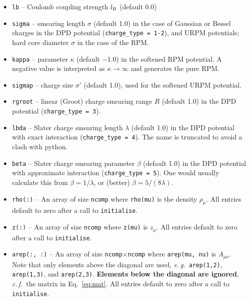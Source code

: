 \documentclass[12pt,a4paper]{article}
\newcommand{\latin}[1]{\emph{#1}}
\newcommand{\eg}{\latin{e.\,g.}}
\newcommand{\cf}{\latin{c.\,f.}}
\newcommand{\Eqref}[1]{Eq.~\eqref{#1}}
\begin{document}
\begin{itemize}
%
\item\verb+lb+ -- Coulomb coupling strength $l_{\mathrm{B}}$ (default 0.0)
%
\item\verb+sigma+ -- smearing length $\sigma$ (default 1.0) in the
  case of Gaussian or Bessel charges in the DPD potential
  (\verb+charge_type = 1-2+), and URPM potentials; hard core diameter
  $\sigma$ in the case of the RPM.
%
\item\verb+kappa+ -- parameter $\kappa$ (default $-$1.0) in the
  softened RPM potential.  A negative value is interpreted as
  $\kappa\to\infty$ and generates the pure RPM.
%
\item\verb+sigmap+ -- charge size $\sigma'$ (default 1.0), used for
  the softened URPM potential.
%
\item\verb+rgroot+ -- linear (Groot) charge smearing range $R$
  (default 1.0) in the DPD potential (\verb+charge_type = 3+).
%
\item\verb+lbda+ -- Slater charge smearing length $\lambda$ (default
  1.0) in the DPD potential with exact interaction
  (\verb+charge_type = 4+).  The name is truncated to avoid a clash
  with python.
%
\item\verb+beta+ -- Slater charge smearing parameter $\beta$
  (default 1.0) in the DPD potential with approximate interaction
  (\verb+charge_type = 5+).  One would usually calculate this from
  $\beta=1/\lambda$, or (better) $\beta=5/(8\lambda)$.
%
\item\verb+rho(:)+ -- An array of size \verb+ncomp+ where
  \verb+rho(mu)+ is the density $\rho_\mu$.  All entries default to
  zero after a call to \verb+initialise+.
%
\item\verb+z(:)+ -- An array of size \verb+ncomp+ where
  \verb+z(mu)+ is $z_\mu$.  All entries default to
  zero after a call to \verb+initialise+.
%
\item\verb+arep(:, :)+ -- An array of size
  \verb+ncomp+$\times$\verb+ncomp+ where \verb+arep(mu, nu)+ is
  $A_{\mu\nu}$.  Note that only elements above the diagonal are used,
  \eg\ \verb+arep(1,2)+, \verb+arep(1,3)+, and \verb+arep(2,3)+.  {\bf
    Elements below the diagonal are ignored}, \cf\ the matrix in
  \Eqref{eq:mat}.  All entries default to zero after a call to
    \verb+initialise+.
%
\end{itemize}
\end{document}
